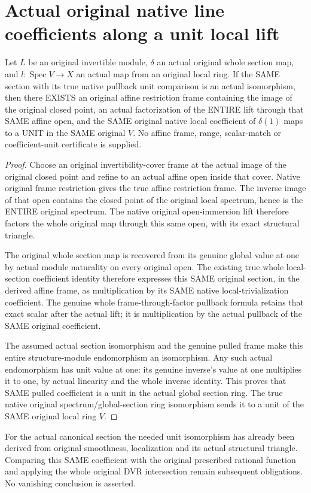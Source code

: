 \section{Actual original native line coefficients along a unit local lift}
\label{sec:valuative-line-coefficients}

\begin{theorem}
\label{sc0-valuative-line-coefficients:actual-unit-coefficient}
\leanok
Let $L$ be an original invertible module, $\delta$ an actual original
whole section map, and $l:\operatorname{Spec}V\to X$ an actual map
from an original local ring. If the SAME section with its true
native pullback unit comparison is an actual isomorphism, then
there EXISTS an original affine restriction frame containing the
image of the original closed point, an actual factorization of the
ENTIRE lift through that SAME affine open, and the SAME original
native local coefficient of $\delta(1)$ maps to a UNIT in the SAME
original $V$. No affine frame, range, scalar-match or coefficient-unit
certificate is supplied.
\end{theorem}
\begin{proof}
Choose an original invertibility-cover frame at the actual image
of the original closed point and refine to an actual affine open
inside that cover. Native original frame restriction gives the
true affine restriction frame. The inverse image of that open
contains the closed point of the original local spectrum, hence
is the ENTIRE original spectrum. The native original open-immersion
lift therefore factors the whole original map through this same
open, with its exact structural triangle.

The original whole section map is recovered from its genuine global
value at one by actual module naturality on every original open.
The existing true whole local-section coefficient identity therefore
expresses this SAME original section, in the derived affine frame,
as multiplication by its SAME native local-trivialization coefficient.
The genuine whole frame-through-factor pullback formula retains
that exact scalar after the actual lift; it is multiplication by
the actual pullback of the SAME original coefficient.

The assumed actual section isomorphism and the genuine pulled
frame make this entire structure-module endomorphism an isomorphism.
Any such actual endomorphism has unit value at one: its genuine
inverse's value at one multiplies it to one, by actual linearity
and the whole inverse identity. This proves that SAME pulled
coefficient is a unit in the actual global section ring. The true
native original spectrum/global-section ring isomorphism sends it
to a unit of the SAME original local ring $V$.
\end{proof}

For the actual canonical section the needed unit isomorphism has
already been derived from original smoothness, localization and
its actual structural triangle. Comparing this SAME coefficient
with the original prescribed rational function and applying the
whole original DVR intersection remain subsequent obligations.
No vanishing conclusion is asserted.
